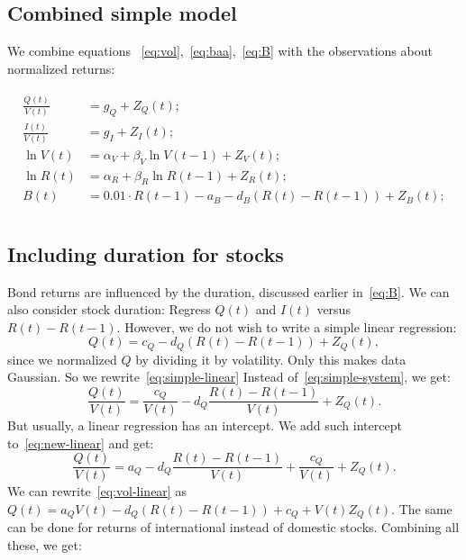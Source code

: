 \documentclass[12pt]{amsart}
\begin{document}
\subsection{Combined simple model} We combine equations ~\eqref{eq:vol},~\eqref{eq:baa},~\eqref{eq:B} with the observations about normalized returns:

\begin{align}
\label{eq:simple-system}
\begin{split}
\frac{Q(t)}{V(t)} &= g_Q + Z_Q(t);\\
\frac{I(t)}{V(t)} &= g_I + Z_I(t);\\
\ln V(t) &= \alpha_V  + \beta_V\ln V(t-1) + Z_V(t);\\
\ln R(t) &= \alpha_R + \beta_R\ln R(t-1) + Z_R(t);\\
B(t) &= 0.01\cdot R(t-1) -a_B - d_B(R(t) - R(t-1)) + Z_B(t);\\
\end{split}
\end{align}

\subsection{Including duration for stocks} Bond returns are influenced by the duration, discussed earlier in~\eqref{eq:B}. We can also consider stock duration: Regress $Q(t)$ and $I(t)$ versus $R(t) - R(t-1)$. However, we do not wish to write a simple linear regression:
\begin{equation}
\label{eq:simple-linear}
Q(t) = c_Q - d_Q(R(t) - R(t-1)) + Z_Q(t),
\end{equation}
since we normalized $Q$ by dividing it by volatility. Only this makes data Gaussian. So we rewrite~\eqref{eq:simple-linear}
Instead of~\eqref{eq:simple-system}, we get: 
\begin{equation}
\label{eq:new-linear}
\frac{Q(t)}{V(t)} = \frac{c_Q}{V(t)} - d_Q\frac{R(t) - R(t-1)}{V(t)} + Z_Q(t).
\end{equation}
But usually, a linear regression has an intercept. We add such intercept to~\eqref{eq:new-linear} and get:
\begin{equation}
\label{eq:vol-linear}
\frac{Q(t)}{V(t)} = a_Q - d_Q\frac{R(t) - R(t-1)}{V(t)} + \frac{c_Q}{V(t)} + Z_Q(t).
\end{equation}
We can rewrite~\eqref{eq:vol-linear} as $Q(t) = a_QV(t) - d_Q(R(t) - R(t-1)) + c_Q + V(t)Z_Q(t)$. The same can be done for returns of international instead of domestic stocks. Combining all these, we get:
\end{document}
